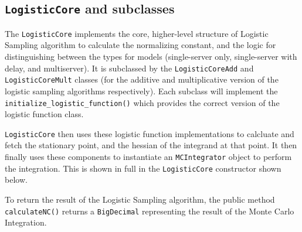 \subsection*{\texttt{LogisticCore} and subclasses}
The \texttt{LogisticCore} implements the core, higher-level structure of Logistic Sampling algorithm to calculate the normalizing constant, and the logic for distinguishing between the types for models (single-server only, single-server with delay, and multiserver). It is subclassed by the \texttt{LogisticCoreAdd} and \texttt{LogisticCoreMult} classes (for the additive and multiplicative version of the logistic sampling algorithms respectively). Each subclass will implement the \texttt{initialize\_logistic\_function()} which provides the correct version of the logistic function class.



\texttt{LogisticCore} then uses these logistic function implementations to calcluate and fetch the stationary point, and the hessian of the integrand at that point. It then finally uses these components to instantiate an \texttt{MCIntegrator} object to perform the integration. This is shown in full in the \texttt{LogisticCore} constructor shown below.


To return the result of the Logistic Sampling algorithm, the public method \texttt{calculateNC()} returns a \texttt{BigDecimal} representing the result of the Monte Carlo Integration.

